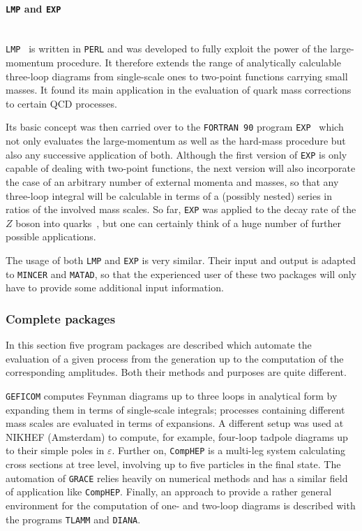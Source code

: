 \paragraph{{\tt LMP} and {\tt EXP}}\mbox{}\\[1em]
%
{\tt LMP}~\cite{Har:diss} is written in {\tt PERL} and was developed to
fully exploit the power of the large-momentum procedure. It therefore
extends the range of analytically calculable three-loop diagrams from
single-scale ones to two-point functions carrying small masses. It found
its main application in the evaluation of quark mass corrections to
certain QCD processes.

Its basic concept was then carried over to the {\tt FORTRAN~90} program
{\tt EXP}~\cite{Sei:dipl} which not only evaluates the large-momentum as
well as the hard-mass procedure but also any successive application of
both. Although the first version of {\tt EXP} is only capable of dealing
with two-point functions, the next version will also incorporate the
case of an arbitrary number of external momenta and masses, so that any
three-loop integral will be calculable in terms of a (possibly nested)
series in ratios of the involved mass scales. So far, {\tt EXP} was
applied to the decay rate of the $Z$ boson into
quarks~\cite{HarSeiSte97}, but one can certainly think of a huge number
of further possible applications.

The usage of both {\tt LMP} and {\tt EXP} is very similar. Their input
and output is adapted to {\tt MINCER} and {\tt MATAD}, so that
the experienced user of these two packages will only have to
provide some additional input information.


\subsubsection{\label{subcompl}Complete packages}

%
In this section five program packages are described
which automate the evaluation of a given process from
the generation up to the computation of the corresponding amplitudes.
Both their methods and purposes are quite different.

{\tt GEFICOM} computes Feynman diagrams up to three loops in analytical
form by expanding them in terms of single-scale integrals; processes
containing different mass scales are evaluated in terms of expansions. A
different setup was used at NIKHEF (Amsterdam) to compute, for example,
four-loop tadpole diagrams up to their simple poles in $\varepsilon$.
Further on, {\tt CompHEP} is a multi-leg system calculating cross
sections at tree level, involving up to five particles in the final
state. The automation of {\tt GRACE} relies heavily on numerical methods
and has a similar field of application like {\tt CompHEP}.  Finally, an
approach to provide a rather general environment for the computation of
one- and two-loop diagrams is described with the programs {\tt TLAMM}
and {\tt DIANA}.


